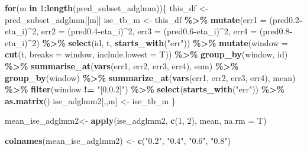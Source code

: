 \documentclass[
]{article}
\newenvironment{Shaded}{\begin{snugshade}}{\end{snugshade}}
\newcommand{\AttributeTok}[1]{\textcolor[rgb]{0.13,0.29,0.53}{#1}}
\newcommand{\ControlFlowTok}[1]{\textcolor[rgb]{0.13,0.29,0.53}{\textbf{#1}}}
\newcommand{\DecValTok}[1]{\textcolor[rgb]{0.00,0.00,0.81}{#1}}
\newcommand{\FloatTok}[1]{\textcolor[rgb]{0.00,0.00,0.81}{#1}}
\newcommand{\FunctionTok}[1]{\textcolor[rgb]{0.13,0.29,0.53}{\textbf{#1}}}
\newcommand{\NormalTok}[1]{#1}
\newcommand{\OtherTok}[1]{\textcolor[rgb]{0.56,0.35,0.01}{#1}}
\newcommand{\SpecialCharTok}[1]{\textcolor[rgb]{0.81,0.36,0.00}{\textbf{#1}}}
\newcommand{\StringTok}[1]{\textcolor[rgb]{0.31,0.60,0.02}{#1}}
\begin{document}
\begin{Shaded}
\begin{Highlighting}[]
\ControlFlowTok{for}\NormalTok{(m }\ControlFlowTok{in} \DecValTok{1}\SpecialCharTok{:}\FunctionTok{length}\NormalTok{(pred\_subset\_adglmm))\{}
\NormalTok{  this\_df }\OtherTok{\textless{}{-}}\NormalTok{ pred\_subset\_adglmm[[m]]}
\NormalTok{  ise\_tb\_m }\OtherTok{\textless{}{-}}\NormalTok{ this\_df }\SpecialCharTok{\%\textgreater{}\%}
    \FunctionTok{mutate}\NormalTok{(}\AttributeTok{err1 =}\NormalTok{ (pred0}\FloatTok{.2}\SpecialCharTok{{-}}\NormalTok{eta\_i)}\SpecialCharTok{\^{}}\DecValTok{2}\NormalTok{,}
           \AttributeTok{err2 =}\NormalTok{ (pred0}\FloatTok{.4}\SpecialCharTok{{-}}\NormalTok{eta\_i)}\SpecialCharTok{\^{}}\DecValTok{2}\NormalTok{,}
           \AttributeTok{err3 =}\NormalTok{ (pred0}\FloatTok{.6}\SpecialCharTok{{-}}\NormalTok{eta\_i)}\SpecialCharTok{\^{}}\DecValTok{2}\NormalTok{,}
           \AttributeTok{err4 =}\NormalTok{ (pred0}\FloatTok{.8}\SpecialCharTok{{-}}\NormalTok{eta\_i)}\SpecialCharTok{\^{}}\DecValTok{2}\NormalTok{) }\SpecialCharTok{\%\textgreater{}\%}
    \FunctionTok{select}\NormalTok{(id, t, }\FunctionTok{starts\_with}\NormalTok{(}\StringTok{"err"}\NormalTok{)) }\SpecialCharTok{\%\textgreater{}\%} 
    \FunctionTok{mutate}\NormalTok{(}\AttributeTok{window =} \FunctionTok{cut}\NormalTok{(t, }\AttributeTok{breaks =}\NormalTok{ window, }\AttributeTok{include.lowest =}\NormalTok{ T)) }\SpecialCharTok{\%\textgreater{}\%} 
    \FunctionTok{group\_by}\NormalTok{(window, id) }\SpecialCharTok{\%\textgreater{}\%} 
    \FunctionTok{summarise\_at}\NormalTok{(}\FunctionTok{vars}\NormalTok{(err1, err2, err3, err4), sum) }\SpecialCharTok{\%\textgreater{}\%} 
    \FunctionTok{group\_by}\NormalTok{(window) }\SpecialCharTok{\%\textgreater{}\%} 
    \FunctionTok{summarize\_at}\NormalTok{(}\FunctionTok{vars}\NormalTok{(err1, err2, err3, err4), mean) }\SpecialCharTok{\%\textgreater{}\%}
    \FunctionTok{filter}\NormalTok{(window }\SpecialCharTok{!=} \StringTok{"[0,0.2]"}\NormalTok{) }\SpecialCharTok{\%\textgreater{}\%} 
    \FunctionTok{select}\NormalTok{(}\FunctionTok{starts\_with}\NormalTok{(}\StringTok{"err"}\NormalTok{)) }\SpecialCharTok{\%\textgreater{}\%} \FunctionTok{as.matrix}\NormalTok{()}
\NormalTok{  ise\_adglmm2[,,m] }\OtherTok{\textless{}{-}}\NormalTok{ ise\_tb\_m}
\NormalTok{\}}

\NormalTok{mean\_ise\_adglmm2}\OtherTok{\textless{}{-}} \FunctionTok{apply}\NormalTok{(ise\_adglmm2, }\FunctionTok{c}\NormalTok{(}\DecValTok{1}\NormalTok{, }\DecValTok{2}\NormalTok{), mean, }\AttributeTok{na.rm =}\NormalTok{ T)}

\FunctionTok{colnames}\NormalTok{(mean\_ise\_adglmm2) }\OtherTok{\textless{}{-}} \FunctionTok{c}\NormalTok{(}\StringTok{"0.2"}\NormalTok{, }\StringTok{"0.4"}\NormalTok{, }\StringTok{"0.6"}\NormalTok{, }\StringTok{"0.8"}\NormalTok{)}
\end{Highlighting}
\end{Shaded}
\end{document}
